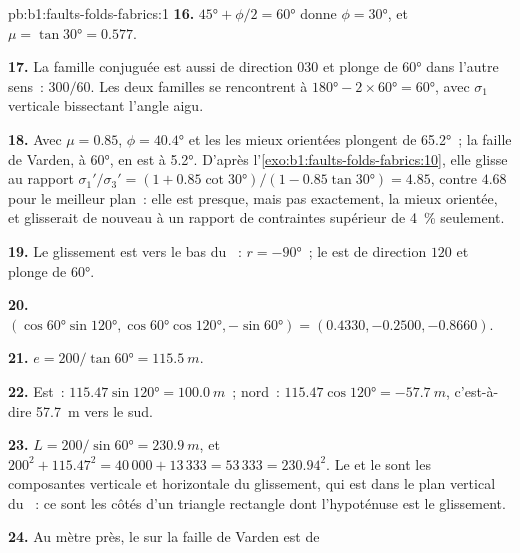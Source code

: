 \begin{solution}{pb:b1:faults-folds-fabrics:1}
\textbf{16.} $\ang{45} + \phi/2 = \ang{60}$ donne $\phi = \ang{30}$, et
$\mu = \tan\ang{30} = 0.577$.

\textbf{17.} La famille conjuguée est aussi de direction $030$ et plonge de \ang{60} dans l'autre
sens~: $300/60$. Les deux familles se rencontrent à $\ang{180} - 2\times\ang{60} = \ang{60}$,
avec $\sigma_1$ verticale bissectant l'angle aigu.

\textbf{18.} Avec $\mu = 0.85$, $\phi = \ang{40.4}$ et les  les mieux orientées
plongent de \ang{65.2}~; la faille de Varden, à \ang{60}, en est à \ang{5.2}.
D'après l'\cref{exo:b1:faults-folds-fabrics:10}, elle glisse au rapport
$\sigma_1'/\sigma_3' = (1 + 0.85\cot\ang{30})/(1 - 0.85\tan\ang{30}) = 4.85$,
contre $4.68$ pour le meilleur plan~: elle est presque, mais pas exactement, la mieux
orientée, et glisserait de nouveau à un rapport de contraintes supérieur de \qty{4}{\percent}
seulement.

\textbf{19.} Le glissement est vers le bas du ~: $r = \ang{-90}$~; le  est de direction
$120$ et plonge de \ang{60}.

\textbf{20.} $(\cos\ang{60}\sin\ang{120}, \cos\ang{60}\cos\ang{120},
-\sin\ang{60}) = (0.4330, -0.2500, -0.8660)$.

\textbf{21.} $e = 200/\tan\ang{60} = \qty{115.5}{m}$.

\textbf{22.} Est~: $115.47\sin\ang{120} = \qty{100.0}{m}$~; nord~:
$115.47\cos\ang{120} = \qty{-57.7}{m}$, c'est-à-dire \qty{57.7}{m} vers le sud.

\textbf{23.} $L = 200/\sin\ang{60} = \qty{230.9}{m}$, et
$200^2 + 115.47^2 = 40\,000 + 13\,333 = 53\,333 = 230.94^2$. Le  et le
 sont les composantes verticale et horizontale du glissement, qui est dans
le plan vertical du ~: ce sont les côtés d'un triangle rectangle dont
l'hypoténuse est le glissement.

\textbf{24.} Au mètre près, le  sur la faille de Varden est de
\end{solution}

